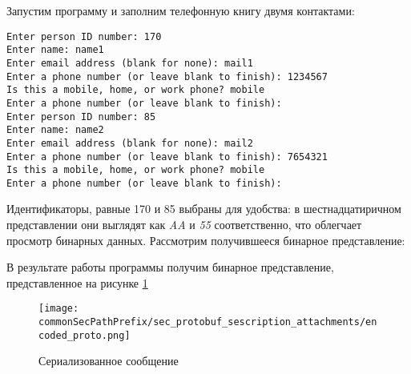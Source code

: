 Запустим программу и заполним телефонную книгу двумя контактами:

\begin{lstlisting}
Enter person ID number: 170
Enter name: name1
Enter email address (blank for none): mail1
Enter a phone number (or leave blank to finish): 1234567
Is this a mobile, home, or work phone? mobile
Enter a phone number (or leave blank to finish):
Enter person ID number: 85
Enter name: name2
Enter email address (blank for none): mail2
Enter a phone number (or leave blank to finish): 7654321
Is this a mobile, home, or work phone? mobile
Enter a phone number (or leave blank to finish):
\end{lstlisting}

Идентификаторы, равные 170 и 85 выбраны для удобства: в шестнадцатиричном представлении они выглядят как \textit{AA} и \textit{55} соответственно, что облегчает просмотр бинарных данных.
Рассмотрим получившееся бинарное представление:

В результате работы программы получим бинарное представление, представленное на рисунке \ref{fig:encoded_proto}
\begin{figure}[ht]
    \centering
    \texttt{[image: \\commonSecPathPrefix/sec\_protobuf\_sescription\_attachments/encoded\_proto.png]}
    \caption{Сериализованное сообщение}
    \label{fig:encoded_proto}
\end{figure}

